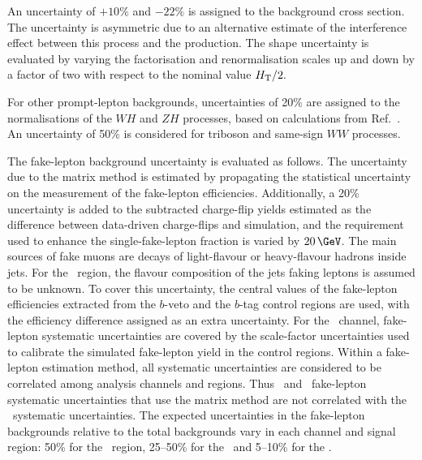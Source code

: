 An uncertainty of $+10\%$ and $-22\%$ is assigned to the \WtZ background cross
section. The uncertainty is asymmetric due to an alternative estimate of the
interference effect between this process and the \ttZ production.  The shape
uncertainty is evaluated by varying the factorisation and renormalisation
scales up and down by a factor of two with respect to the nominal value $H_{\rm T}/2.$

For other prompt-lepton backgrounds, uncertainties of 20\% are assigned to the
normalisations of the $WH$ and $ZH$ processes, based on calculations from
Ref.~\cite{Heinemeyer:2013tqa}.  An uncertainty of 50\% is considered for
triboson and same-sign $WW$ processes.

The fake-lepton background uncertainty is evaluated as follows.  The uncertainty due to the matrix method is estimated by propagating the
statistical uncertainty on the measurement of the fake-lepton efficiencies.
Additionally, a 20\% uncertainty is added to the subtracted charge-flip yields
estimated as the difference between data-driven charge-flips and simulation,
and the \met requirement used to enhance the single-fake-lepton fraction is varied by 
$20\,\GeV$. The main sources 
of fake muons are
decays of light-flavour or heavy-flavour hadrons inside jets.  For the \SSLSR\
region, the flavour composition of the jets faking leptons is assumed to be
unknown. To cover this uncertainty, the central values of the fake-lepton
efficiencies extracted from the $b$-veto and the $b$-tag control regions are
used, with the efficiency difference assigned as an extra uncertainty. For the
\FL\ channel, fake-lepton systematic uncertainties are covered by the
scale-factor uncertainties used to calibrate the simulated fake-lepton yield in
the control regions. Within a fake-lepton estimation method, all systematic
uncertainties are considered to be correlated among analysis channels and
regions. Thus \SSLSR\ and \TL\ fake-lepton systematic uncertainties that use the
matrix method are not correlated with the \FL\ systematic uncertainties.  The
expected uncertainties in the fake-lepton backgrounds relative to the total
backgrounds vary in each channel and signal region: 50\% for the \SSLSR\
region, 25--50\% for the \TLC\ and 5--10\% for the \FLC.
